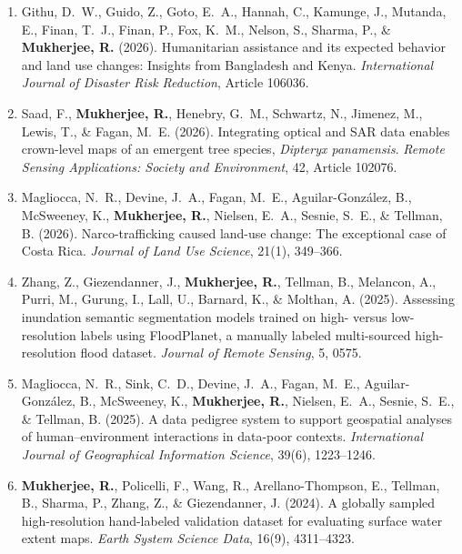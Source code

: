 \documentclass[10pt,letterpaper]{article}
\begin{document}
\small
\begin{enumerate}[leftmargin=0.2in, itemsep=0.25em]
  \item Githu, D.\ W., Guido, Z., Goto, E.\ A., Hannah, C., Kamunge, J., Mutanda, E., Finan, T.\ J., Finan, P., Fox, K.\ M., Nelson, S., Sharma, P., \& \textbf{Mukherjee, R.} (2026).
  Humanitarian assistance and its expected behavior and land use changes: Insights from Bangladesh and Kenya.
  \emph{International Journal of Disaster Risk Reduction}, Article 106036.


  \item Saad, F., \textbf{Mukherjee, R.}, Henebry, G.\ M., Schwartz, N., Jimenez, M., Lewis, T., \& Fagan, M.\ E. (2026).
  Integrating optical and SAR data enables crown-level maps of an emergent tree species, \emph{Dipteryx panamensis}.
  \emph{Remote Sensing Applications: Society and Environment}, 42, Article 102076.

  \item Magliocca, N.\ R., Devine, J.\ A., Fagan, M.\ E., Aguilar-Gonz\'{a}lez, B., McSweeney, K., \textbf{Mukherjee, R.}, Nielsen, E.\ A., Sesnie, S.\ E., \& Tellman, B. (2026).
  Narco-trafficking caused land-use change: The exceptional case of Costa Rica.
  \emph{Journal of Land Use Science}, 21(1), 349--366.

  \item Zhang, Z., Giezendanner, J., \textbf{Mukherjee, R.}, Tellman, B., Melancon, A., Purri, M., Gurung, I., Lall, U., Barnard, K., \& Molthan, A. (2025).
  Assessing inundation semantic segmentation models trained on high- versus low-resolution labels using FloodPlanet, a manually labeled multi-sourced high-resolution flood dataset.
  \emph{Journal of Remote Sensing}, 5, 0575.

  \item Magliocca, N.\ R., Sink, C.\ D., Devine, J.\ A., Fagan, M.\ E., Aguilar-Gonz\'{a}lez, B., McSweeney, K., \textbf{Mukherjee, R.}, Nielsen, E.\ A., Sesnie, S.\ E., \& Tellman, B. (2025).
  A data pedigree system to support geospatial analyses of human--environment interactions in data-poor contexts.
  \emph{International Journal of Geographical Information Science}, 39(6), 1223--1246.

  \item \textbf{Mukherjee, R.}, Policelli, F., Wang, R., Arellano-Thompson, E., Tellman, B., Sharma, P., Zhang, Z., \& Giezendanner, J. (2024).
  A globally sampled high-resolution hand-labeled validation dataset for evaluating surface water extent maps.
  \emph{Earth System Science Data}, 16(9), 4311--4323.


\end{enumerate}
\end{document}
